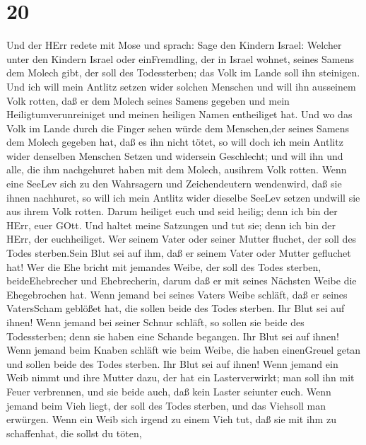 \hypertarget{section-19}{%
\section{20}\label{section-19}}

 Und der HErr redete mit Mose und sprach:  Sage
den Kindern Israel: Welcher unter den Kindern Israel oder einFremdling,
der in Israel wohnet, seines Samens dem Molech gibt, der soll des
Todessterben; das Volk im Lande soll ihn steinigen.  Und ich
will mein Antlitz setzen wider solchen Menschen und will ihn ausseinem
Volk rotten, daß er dem Molech seines Samens gegeben und mein
Heiligtumverunreiniget und meinen heiligen Namen entheiliget hat.
 Und wo das Volk im Lande durch die Finger sehen würde dem
Menschen,der seines Samens dem Molech gegeben hat, daß es ihn nicht
tötet,  so will doch ich mein Antlitz wider denselben
Menschen Setzen und widersein Geschlecht; und will ihn und alle, die ihm
nachgehuret haben mit dem Molech, ausihrem Volk rotten. 
Wenn eine SeeLev sich zu den Wahrsagern und Zeichendeutern wendenwird,
daß sie ihnen nachhuret, so will ich mein Antlitz wider dieselbe SeeLev
setzen undwill sie aus ihrem Volk rotten.  Darum heiliget
euch und seid heilig; denn ich bin der HErr, euer GOtt.  Und
haltet meine Satzungen und tut sie; denn ich bin der HErr, der
euchheiliget.  Wer seinem Vater oder seiner Mutter fluchet,
der soll des Todes sterben.Sein Blut sei auf ihm, daß er seinem Vater
oder Mutter gefluchet hat!  Wer die Ehe bricht mit jemandes
Weibe, der soll des Todes sterben, beideEhebrecher und Ehebrecherin,
darum daß er mit seines Nächsten Weibe die Ehegebrochen hat.
 Wenn jemand bei seines Vaters Weibe schläft, daß er seines
VatersScham geblößet hat, die sollen beide des Todes sterben. Ihr Blut
sei auf ihnen!  Wenn jemand bei seiner Schnur schläft, so
sollen sie beide des Todessterben; denn sie haben eine Schande begangen.
Ihr Blut sei auf ihnen!  Wenn jemand beim Knaben schläft
wie beim Weibe, die haben einenGreuel getan und sollen beide des Todes
sterben. Ihr Blut sei auf ihnen!  Wenn jemand ein Weib
nimmt und ihre Mutter dazu, der hat ein Lasterverwirkt; man soll ihn mit
Feuer verbrennen, und sie beide auch, daß kein Laster seiunter euch.
 Wenn jemand beim Vieh liegt, der soll des Todes sterben,
und das Viehsoll man erwürgen.  Wenn ein Weib sich irgend
zu einem Vieh tut, daß sie mit ihm zu schaffenhat, die sollst du töten,
